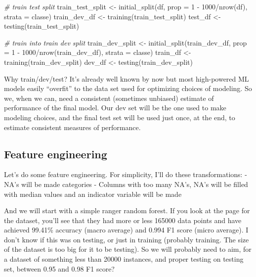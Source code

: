 \documentclass[
]{article}
\newenvironment{Shaded}{\begin{snugshade}}{\end{snugshade}}
\newcommand{\AttributeTok}[1]{\textcolor[rgb]{0.77,0.63,0.00}{#1}}
\newcommand{\CommentTok}[1]{\textcolor[rgb]{0.56,0.35,0.01}{\textit{#1}}}
\newcommand{\DecValTok}[1]{\textcolor[rgb]{0.00,0.00,0.81}{#1}}
\newcommand{\FunctionTok}[1]{\textcolor[rgb]{0.00,0.00,0.00}{#1}}
\newcommand{\NormalTok}[1]{#1}
\newcommand{\OtherTok}[1]{\textcolor[rgb]{0.56,0.35,0.01}{#1}}
\newcommand{\SpecialCharTok}[1]{\textcolor[rgb]{0.00,0.00,0.00}{#1}}
\begin{document}
\begin{Shaded}
\begin{Highlighting}[]
\CommentTok{\# train test split}
\NormalTok{train\_test\_split }\OtherTok{\textless{}{-}} \FunctionTok{initial\_split}\NormalTok{(df, }\AttributeTok{prop =} \DecValTok{1} \SpecialCharTok{{-}} \DecValTok{1000}\SpecialCharTok{/}\FunctionTok{nrow}\NormalTok{(df), }\AttributeTok{strata =}\NormalTok{ classe)}
\NormalTok{train\_dev\_df }\OtherTok{\textless{}{-}} \FunctionTok{training}\NormalTok{(train\_test\_split)}
\NormalTok{test\_df }\OtherTok{\textless{}{-}} \FunctionTok{testing}\NormalTok{(train\_test\_split)}

\CommentTok{\# train into train dev split}
\NormalTok{train\_dev\_split }\OtherTok{\textless{}{-}} \FunctionTok{initial\_split}\NormalTok{(train\_dev\_df, }\AttributeTok{prop =} \DecValTok{1} \SpecialCharTok{{-}} \DecValTok{1000}\SpecialCharTok{/}\FunctionTok{nrow}\NormalTok{(train\_dev\_df), }\AttributeTok{strata =}\NormalTok{ classe)}
\NormalTok{train\_df }\OtherTok{\textless{}{-}} \FunctionTok{training}\NormalTok{(train\_dev\_split)}
\NormalTok{dev\_df }\OtherTok{\textless{}{-}} \FunctionTok{testing}\NormalTok{(train\_dev\_split)}
\end{Highlighting}
\end{Shaded}

Why train/dev/test? It's already well known by now but most high-powered
ML models easily ``overfit'' to the data set used for optimizing choices
of modeling. So we, when we can, need a consistent (sometimes unbiased)
estimate of performance of the final model. Our dev set will be the one
used to make modeling choices, and the final test set will be used just
once, at the end, to estimate consistent measures of performance.

\hypertarget{feature-engineering}{%
\subsection{Feature engineering}\label{feature-engineering}}

Let's do some feature engineering. For simplicity, I'll do these
transformations: - NA's will be made categories - Columns with too many
NA's, NA's will be filled with median values and an indicator variable
will be made

And we will start with a simple ranger random forest. If you look at the
page for the dataset, you'll see that they had more or less 165000 data
points and have achieved 99.41\% accuracy (macro average) and 0.994 F1
score (micro average). I don't know if this was on testing, or just in
training (probably training. The size of the dataset is too big for it
to be testing). So we will probably need to aim, for a dataset of
something less than 20000 instances, and proper testing on testing set,
between 0.95 and 0.98 F1 score?
\end{document}
